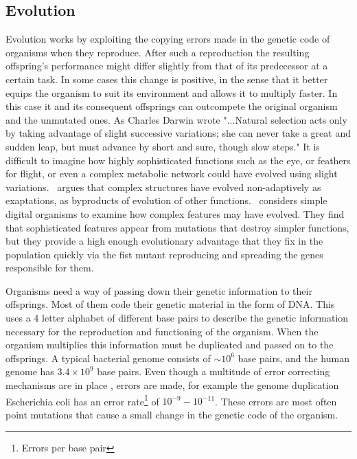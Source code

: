 \documentclass[a4paper,12pt]{article}
\begin{document}
	
	\subsection{Evolution}\label{chap:evolution}
	
	Evolution works by exploiting the copying errors made in the genetic code of organisms when they reproduce. After such a reproduction the resulting offspring's performance might differ slightly from that of its predecessor at a certain task. In some cases this change is positive, in the sense that it better equips the organism to suit its environment and allows it to multiply faster. In this case it and its consequent offsprings can outcompete the original organism and the unmutated ones.  As Charles Darwin wrote "...Natural selection acts only by taking advantage of slight successive variations; she can never take a great and sudden leap, but must advance by short and sure, though slow steps." \cite{darwin} 
	It is difficult to imagine how highly sophisticated functions such as the eye, or feathers for flight, or even a complex metabolic network could have evolved using slight variations. \cite{latent}~argues that complex structures have evolved non-adaptively as exaptations, as byproducts of evolution of other functions. \cite{complexfeatures}~considers simple digital organisms to examine how complex features may have evolved. They find that sophisticated features appear from mutations that destroy simpler functions, but they provide a high enough evolutionary advantage that they fix in the population quickly via the fist mutant reproducing and spreading the genes responsible for them. 
	

	Organisms need a way of passing down their genetic information to their offsprings. 
	Most of them code their genetic material in the form of DNA. This uses a 4 letter alphabet of different base pairs to describe the genetic information necessary for the reproduction and functioning of the organism. When the organism multiplies this information must be duplicated and passed on to the offsprings. A typical bacterial genome consists of $\sim 10^6$ base pairs, and the human genome has $3.4 \times 10^9$ base pairs. Even though a multitude of error correcting mechanisms are in place \cite{dnarepair}, errors are made, for example the genome duplication Escherichia coli has an error rate\footnote{Errors per base pair} of $10^{-9} - 10^{-11}$\cite{ecolierrorrate}. These errors are most often point mutations that cause a small change in the genetic code of the organism.
	
\end{document}
